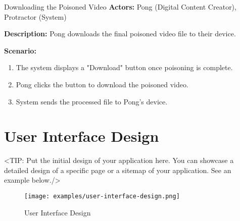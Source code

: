 \begin{usecase}{Downloading the Poisoned Video}
    \textbf{Actors:} Pong (Digital Content Creator), Protractor (System)

    \textbf{Description:} Pong downloads the final poisoned video file to their device.

    \textbf{Scenario:}
    \begin{enumerate}[leftmargin=80pt]
        \item The system displays a "Download" button once poisoning is complete.
        \item Pong clicks the button to download the poisoned video.
        \item System sends the processed file to Pong’s device.
    \end{enumerate}
\end{usecase}


\section{User Interface Design}
\label{section:user-interface-design}
<TIP: Put the initial design of your application here. You can
showcase a detailed design of a specific page or a sitemap of your application.
See an example below./>

\begin{figure}[h]
    \centering
    \texttt{[image: examples/user-interface-design.png]}
    \caption{User Interface Design}
\end{figure}